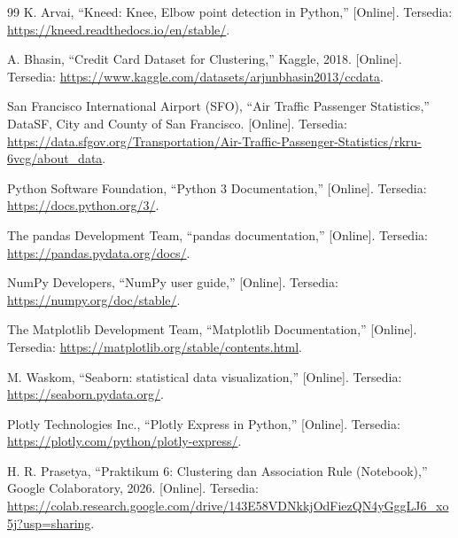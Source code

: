 \documentclass[a4paper,oneside,12pt]{report}
\begin{document}
\begin{thebibliography}{99}
     K. Arvai, ``Kneed: Knee, Elbow point detection in Python,'' [Online]. Tersedia: \url{https://kneed.readthedocs.io/en/stable/}.

     A. Bhasin, ``Credit Card Dataset for Clustering,'' Kaggle, 2018. [Online]. Tersedia: \url{https://www.kaggle.com/datasets/arjunbhasin2013/ccdata}.

     San Francisco International Airport (SFO), ``Air Traffic Passenger Statistics,'' DataSF, City and County of San Francisco. [Online]. Tersedia: \url{https://data.sfgov.org/Transportation/Air-Traffic-Passenger-Statistics/rkru-6vcg/about_data}.

     Python Software Foundation, ``Python 3 Documentation,'' [Online]. Tersedia: \url{https://docs.python.org/3/}.

     The pandas Development Team, ``pandas documentation,'' [Online]. Tersedia: \url{https://pandas.pydata.org/docs/}.

     NumPy Developers, ``NumPy user guide,'' [Online]. Tersedia: \url{https://numpy.org/doc/stable/}.

     The Matplotlib Development Team, ``Matplotlib Documentation,'' [Online]. Tersedia: \url{https://matplotlib.org/stable/contents.html}.

     M. Waskom, ``Seaborn: statistical data visualization,'' [Online]. Tersedia: \url{https://seaborn.pydata.org/}.

     Plotly Technologies Inc., ``Plotly Express in Python,'' [Online]. Tersedia: \url{https://plotly.com/python/plotly-express/}.

     H. R. Prasetya, ``Praktikum 6: Clustering dan Association Rule (Notebook),'' Google Colaboratory, 2026. [Online]. Tersedia: \url{https://colab.research.google.com/drive/143E58VDNkkjOdFiezQN4yGggLJ6_xo5j?usp=sharing}.
\end{thebibliography}
\end{document}
